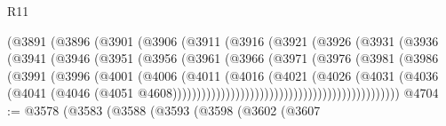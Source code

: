 \begin{lexlean}{R11}
\begin{coremodule}
{{{{{{{{{{{{{{{{{{{{{{{{{{{{{{{{{{{{{{{{{{{{{{{{{{{{{{{{{{{{{{{{{{{{{{{{{{{{{{{{{{                                (@3891
                                  (@3896
                                    (@3901
                                      (@3906
                                        (@3911
                                          (@3916
                                            (@3921
                                              (@3926
                                                (@3931
                                                  (@3936
                                                    (@3941
                                                      (@3946
                                                        (@3951
                                                          (@3956
                                                            (@3961
                                                              (@3966
                                                                (@3971
                                                                  (@3976
                                                                    (@3981
                                                                      (@3986
                                                                        (@3991
                                                                          (@3996
                                                                            (@4001
                                                                              (@4006
                                                                                (@4011
                                                                                  (@4016
                                                                                    (@4021
                                                                                      (@4026
                                                                                        (@4031
                                                                                          (@4036
                                                                                            (@4041
                                                                                              (@4046
                                                                                                (@4051
                                                                                                  @4608)))))))))))))))))))))))))))))))))))))))))))))))
@4704 := @3578
    (@3583
      (@3588
        (@3593
          (@3598
            (@3602
              (@3607
}}}}}}}}}}}}}}}}}}}}}}}}}}}}}}}}}}}}}}}}}}}}}}}}}}}}}}}}}}}}}}}}}}}}}}}}}}}}}}}}}}
\end{coremodule}
\end{lexlean}
